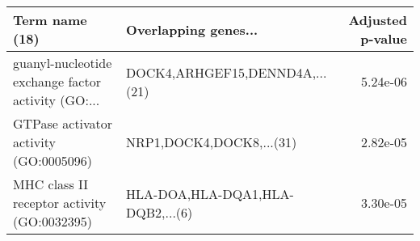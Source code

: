 \begin{tabular}{llr}
\toprule
                                    Term name (18) &             Overlapping genes... &  Adjusted p-value \\
\midrule
guanyl-nucleotide exchange factor activity (GO:... &   DOCK4,ARHGEF15,DENND4A,...(21) &          5.24e-06 \\
            GTPase activator activity (GO:0005096) &         NRP1,DOCK4,DOCK8,...(31) &          2.82e-05 \\
       MHC class II receptor activity (GO:0032395) & HLA-DOA,HLA-DQA1,HLA-DQB2,...(6) &          3.30e-05 \\
\bottomrule
\end{tabular}
